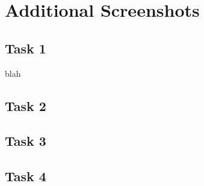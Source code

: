 \section{Additional Screenshots}
\label{app:additionalscreenshots}

\subsection{Task 1}
blah

\subsection{Task 2}

\subsection{Task 3}

\subsection{Task 4}
